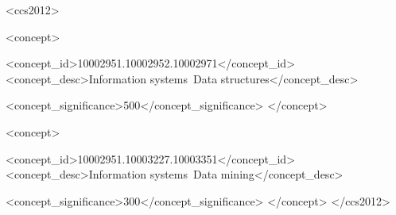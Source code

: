 \documentclass{sig-alternate-05-2015}
\begin{document}
%
%
\begin{CCSXML}

<ccs2012>


<concept>

<concept_id>10002951.10002952.10002971</concept_id>
 <concept_desc>Information systems~Data structures</concept_desc>

<concept_significance>500</concept_significance>
</concept>

<concept>

<concept_id>10002951.10003227.10003351</concept_id>
 <concept_desc>Information systems~Data mining</concept_desc>

<concept_significance>300</concept_significance>
</concept>
</ccs2012>

\end{CCSXML}


%
%

%
%
\printccsdesc













  
%
%

\end{document}
